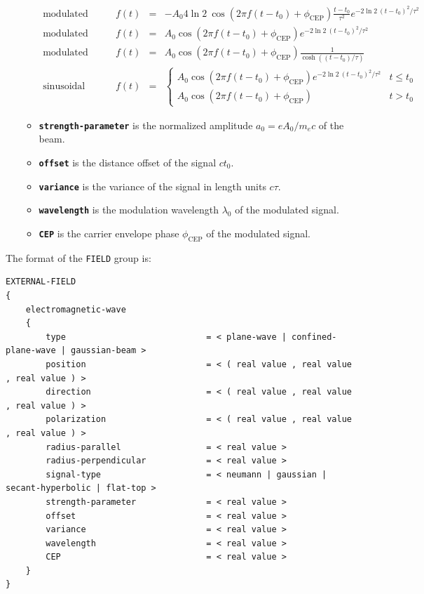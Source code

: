 \begin{enumerate}
\begin{itemize}
	\begin{equation}
	\renewcommand{\arraystretch}{1.5}
	\begin{array}{lrcl}
	\mbox{modulated Neumann:}  \qquad & f(t) & = & \displaystyle - A_0 4 \ln 2 \: \cos( 2 \pi f (t - t_0) + \phi_\mathrm{CEP} ) \frac{t - t_0}{\tau^2} e^{-2 \ln 2 \: (t - t_0)^2/\tau^2 } \\
	\mbox{modulated Gaussian:} \qquad & f(t) & = & \displaystyle A_0 \cos( 2 \pi f (t - t_0) + \phi_\mathrm{CEP} ) e^{-2 \ln 2 \: (t - t_0)^2/\tau^2 } \\
	\mbox{modulated hyperbolic secant:} \qquad & f(t) & = & \displaystyle A_0 \cos( 2 \pi f (t - t_0) + \phi_\mathrm{CEP} ) \frac{1}{\cosh ( (t - t_0)/\tau ) } \\
	\mbox{sinusoidal pulse:}   \qquad & f(t) & = & \displaystyle \left\{ \begin{array}{ll} A_0 \cos( 2 \pi f (t - t_0) + \phi_\mathrm{CEP} ) e^{-2 \ln 2 \: (t - t_0)^2/\tau^2 } & t \leq t_0 \\ A_0 \cos( 2 \pi f (t - t_0) + \phi_\mathrm{CEP} ) & t > t_0 \end{array} \right.
	\end{array}
	\end{equation}
	\item \textbf{\texttt{strength-parameter}} is the normalized amplitude $a_0 = e A_0 / m_ec $ of the beam.
	\item \textbf{\texttt{offset}} is the distance offset of the signal $ct_0$.
	\item \textbf{\texttt{variance}} is the variance of the signal in length units $c\tau$.
	\item \textbf{\texttt{wavelength}} is the modulation wavelength $\lambda_0$ of the modulated signal.
	\item \textbf{\texttt{CEP}} is the carrier envelope phase $\phi_{\mathrm{CEP}}$ of the modulated signal.
\end{itemize}
\end{enumerate}

The format of the \texttt{FIELD} group is:
\begin{Verbatim}[frame=single,fontsize=\small,tabsize=4]
EXTERNAL-FIELD
{
	electromagnetic-wave
	{
		type                            = < plane-wave | confined-plane-wave | gaussian-beam >
		position                        = < ( real value , real value , real value ) >
		direction                       = < ( real value , real value , real value ) >
		polarization                    = < ( real value , real value , real value ) >
		radius-parallel                 = < real value >
		radius-perpendicular            = < real value >
		signal-type                     = < neumann | gaussian | secant-hyperbolic | flat-top >
		strength-parameter              = < real value >
		offset                          = < real value >
		variance                        = < real value >
		wavelength                      = < real value >
		CEP                             = < real value >
	}
}
\end{Verbatim}

